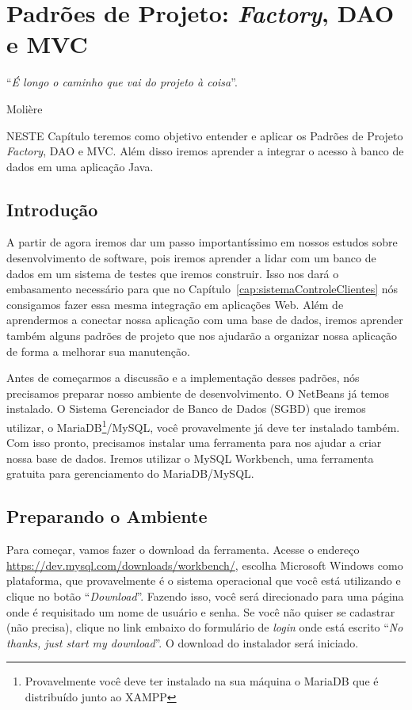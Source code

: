 \chapter{Padrões de Projeto: \textit{Factory}, DAO e MVC}\label{cap:padroesDeProjeto}
\epigraph{``\textit{É longo o caminho que vai do projeto à coisa}''.}{Molière}

\lettrine[lines=4, lhang=0.1, lraise=0, loversize=0.2, findent=0.1em]{\textcolor{corTema}{N}}{ESTE} Capítulo teremos como objetivo entender e aplicar os Padrões de Projeto \textit{Factory}, DAO e MVC. Além disso iremos aprender a integrar o acesso à banco de dados em uma aplicação Java.


\section{Introdução}

A partir de agora iremos dar um passo importantíssimo em nossos estudos sobre desenvolvimento de software, pois iremos aprender a lidar com um banco de dados em um sistema de testes que iremos construir. Isso nos dará o embasamento necessário para que no Capítulo~\ref{cap:sistemaControleClientes} nós consigamos fazer essa mesma integração em aplicações Web. Além de aprendermos a conectar nossa aplicação com uma base de dados, iremos aprender também alguns padrões de projeto que nos ajudarão a organizar nossa aplicação de forma a melhorar sua manutenção. 

Antes de começarmos a discussão e a implementação desses padrões, nós precisamos preparar nosso ambiente de desenvolvimento. O NetBeans já temos instalado. O Sistema Gerenciador de Banco de Dados (SGBD) que iremos utilizar, o MariaDB\footnote{Provavelmente você deve ter instalado na sua máquina o MariaDB que é distribuído junto ao XAMPP}/MySQL, você provavelmente já deve ter instalado também. Com isso pronto, precisamos instalar uma ferramenta para nos ajudar a criar nossa base de dados. Iremos utilizar o MySQL Workbench, uma ferramenta gratuita para gerenciamento do MariaDB/MySQL. 


\section{Preparando o Ambiente}\label{sec:preparandoAmbiente}

Para começar, vamos fazer o download da ferramenta. Acesse o endereço \url{https://dev.mysql.com/downloads/workbench/}, escolha Microsoft Windows como plataforma, que provavelmente é o sistema operacional que você está utilizando e clique no botão ``\textit{Download}''. Fazendo isso, você será direcionado para uma página onde é requisitado um nome de usuário e senha. Se você não quiser se cadastrar (não precisa), clique no link embaixo do formulário de \textit{login} onde está escrito ``\textit{No thanks, just start my download}''. O download do instalador será iniciado.

